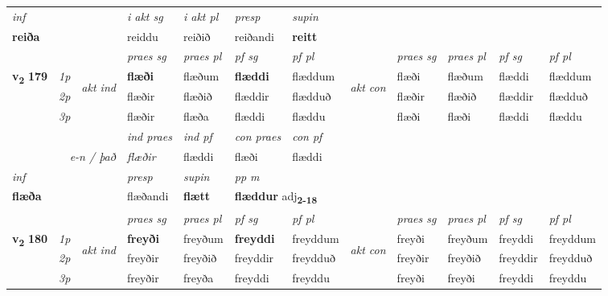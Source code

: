 \begin{longtable}[l]{X>{\footnotesize\itshape}llXXXXlXXXX}
\cmidrule{4-7}
   {\textit{inf}} & &  & \textit{i akt sg} & \textit{i akt pl}   & \textit{presp} & \textit{supin}   \\*
  {\textbf{reiða}} & && reiddu  & reiðið   & reiðandi &  \textbf{reitt}   \\*

\midrule

 & &   & \textit{praes sg}  & \textit{praes pl}    & \textit{ pf sg} & \textit{pf pl} & & \textit{praes sg}  & \textit{praes pl}    & \textit{pf sg} & \textit{pf pl }  \\ \cmidrule{4-7} \cmidrule{9-12}
 \multirow{2}{*}{{{\textbf{v{\textsubscript{2}}} \Large{\textbf{179}}}}}  & 1p & \multirow{3}{*}{\begin{turn}{90}\textit{akt ind}\end{turn}} & \textbf{flæði} & flæðum & \textbf{flæddi} & flæddum & \multirow{3}{*}{\begin{turn}{90}\textit{akt con}\end{turn}} &flæði & flæðum & flæddi & flæddum\\*
 & 2p &  &  flæðir  & flæðið & flæddir & flædduð & & flæðir & flæðið & flæddir & flædduð \\*
 & 3p &  & flæðir & flæða & flæddi & flæddu & & flæði & flæði& flæddi & flæddu \\*
\cmidrule{4-7} \cmidrule{9-12}

   && &  \textit{ind praes} & \textit{ind pf} & \textit{con praes} & \textit{con pf} \\*
\multicolumn{3}{r}{\textit{e-n / það}} & flæðir & flæddi & flæði & flæddi \\*

\cmidrule{4-7}
   {\textit{inf}} & &     & \textit{presp} & \textit{supin}  & \textit{pp m} \\*
  {\textbf{flæða}} & &     & flæðandi &  \textbf{flætt}  & \multicolumn{2}{l}{\textbf{flæddur} adj\textbf{\textsubscript{2-18}}} \\*

\midrule

 & &   & \textit{praes sg}  & \textit{praes pl}    & \textit{ pf sg} & \textit{pf pl} & & \textit{praes sg}  & \textit{praes pl}    & \textit{pf sg} & \textit{pf pl }  \\ \cmidrule{4-7} \cmidrule{9-12}
 \multirow{2}{*}{{{\textbf{v{\textsubscript{2}}} \Large{\textbf{180}}}}}  & 1p & \multirow{3}{*}{\begin{turn}{90}\textit{akt ind}\end{turn}} & \textbf{freyði} & freyðum & \textbf{freyddi} & freyddum & \multirow{3}{*}{\begin{turn}{90}\textit{akt con}\end{turn}} &freyði & freyðum & freyddi & freyddum\\*
 & 2p &  &  freyðir  & freyðið & freyddir & freydduð & & freyðir & freyðið & freyddir & freydduð \\*
 & 3p &  & freyðir & freyða & freyddi & freyddu & & freyði & freyði& freyddi & freyddu \\*
\cmidrule{4-7} \cmidrule{9-12}


\end{longtable}
